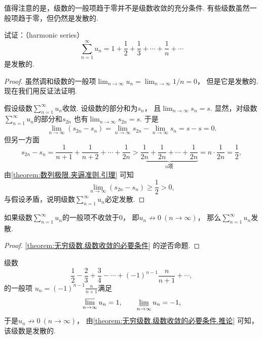 值得注意的是，级数的一般项趋于零并不是级数收敛的充分条件.
有些级数虽然一般项趋于零，但仍然是发散的.
\begin{example}\label{example:无穷级数.调和级数的敛散性}
试证：（harmonic series）\[
	\sum_{n=1}^\infty u_n
	= 1+\frac12+\frac13+\dotsb+\frac1n+\dotsb
\]是发散的.
\begin{proof}
虽然调和级数的一般项\(\lim_{n\to\infty} u_n
= \lim_{n\to\infty} 1/n
= 0\)，
但是它是发散的.
现在我们用反证法证明.

假设级数\(\sum_{n=1}^\infty u_n\)收敛.
设级数的部分和为\(s_n\)，
且\(\lim_{n\to\infty} s_n
= s\).
显然，对级数\(\sum_{n=1}^\infty u_n\)的部分和\(s_{2n}\)
也有\(\lim_{n\to\infty} s_{2n}
= s\).
于是\[
	\lim_{n\to\infty} (s_{2n}-s_n)
	= \lim_{n\to\infty} s_{2n} - \lim_{n\to\infty} s_n
	= s - s
	= 0.
\]
但另一方面\[
	s_{2n} - s_n
	= \frac{1}{n+1}+\frac{1}{n+2}+\dotsb+\frac{1}{2n}
	> \underbrace{\frac{1}{2n}+\frac{1}{2n}+\dotsb+\frac{1}{2n}}_{n\text{项}}
	= n \cdot \frac1{2n}
	= \frac12,
\]
由\cref{theorem:数列极限.夹逼准则.引理} 可知\[
	\lim_{n\to\infty} (s_{2n}-s_n)
	\geq \frac12
	> 0,
\]与假设矛盾，说明级数\(\sum_{n=1}^\infty u_n\)必定发散.
\end{proof}
\end{example}

\begin{corollary}\label{theorem:无穷级数.级数收敛的必要条件.推论}
如果级数\(\sum_{n=1}^\infty u_n\)的一般项不收敛于\(0\)，
即\(u_n \not\to 0\ (n\to\infty)\)，
那么\(\sum_{n=1}^\infty u_n\)发散.
\begin{proof}
\cref{theorem:无穷级数.级数收敛的必要条件} 的逆否命题.
\end{proof}
\end{corollary}

\begin{example}
级数\[
	\frac12-\frac23+\frac34-\dotsb+(-1)^{n-1}\frac{n}{n+1}+\dotsb,
\]的一般项
\(u_n = (-1)^{n-1} \frac{n}{n+1}\)满足\[
	\varlimsup_{n\to\infty} u_n = 1,
	\qquad
	\varliminf_{n\to\infty} u_n = -1,
\]
于是\(u_n \not\to 0\ (n\to\infty)\)，
由\cref{theorem:无穷级数.级数收敛的必要条件.推论} 可知，该级数是发散的.
\end{example}

